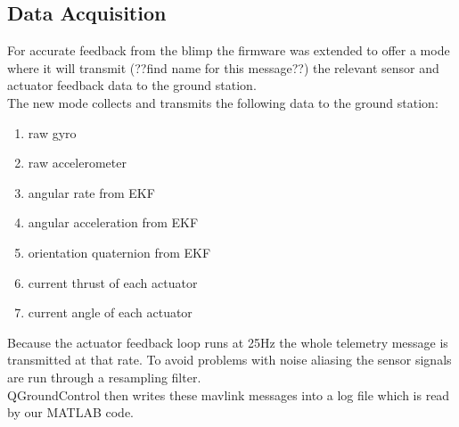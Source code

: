 \subsection{Data Acquisition}
\label{sub:data_acquisition}
For accurate feedback from the blimp the firmware was extended to offer a mode where it will transmit (??find name for this message??) the relevant sensor and actuator feedback data to the ground station. \\
The new mode collects and transmits the following data to the ground station:
\begin{enumerate}
\item raw gyro
\item raw accelerometer
\item angular rate from EKF
\item angular acceleration from EKF
\item orientation quaternion from EKF
\item current thrust of each actuator
\item current angle of each actuator
\end{enumerate}
Because the actuator feedback loop runs at 25Hz the whole telemetry message is transmitted at that rate.
To avoid problems with noise aliasing the sensor signals are run through a resampling filter. \\
QGroundControl then writes these mavlink messages into a log file which is read by our MATLAB code.

